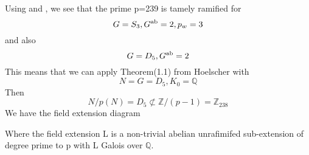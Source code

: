 \documentclass[preprint,12pt,reqno]{elsarticle}
\begin{document}
Using \cite{HOEL} and \cite{JONE}, we see that 
the prime p=239 is tamely ramified for 
\begin{equation}
  G=S_3,G\textsuperscript{ab} = 2, p_w =3  
\end{equation} and also 
\begin{equation}
    G=D_5,G\textsuperscript{ab} = 2 
\end{equation}
This means that we can apply Theorem(1.1) from Hoelscher with
\begin{equation}
    N = G = D_5, K_0 = \mathbb{Q}
\end{equation}
Then 
\begin{equation}
N/p(N) = D_5 \not\subset \mathbb{Z}/(p-1) = \mathbb{Z}_{238}
\end{equation}
\newline
We have the field extension diagram
\bigskip
\newline
\begin{center}
    
\end{center}
\newline
Where the field extension L is a non-trivial abelian unrafimifed sub-extension of degree prime to p with L Galois over $\mathbb{Q}$.
\end{document}
